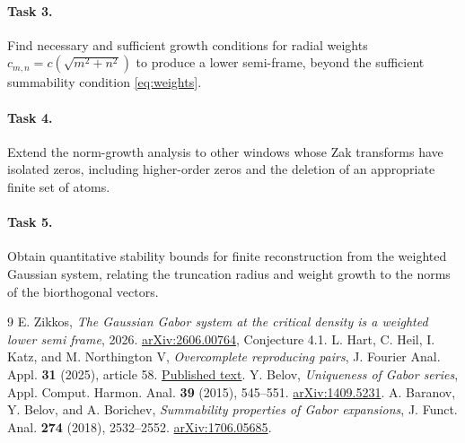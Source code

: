 \documentclass[11pt]{article}
\begin{document}
\paragraph{Task 3.}
Find necessary and sufficient growth conditions for radial weights
$c_{m,n}=c(\sqrt{m^2+n^2})$ to produce a lower semi-frame, beyond the
sufficient summability condition \eqref{eq:weights}.

\paragraph{Task 4.}
Extend the norm-growth analysis to other windows whose Zak transforms
have isolated zeros, including higher-order zeros and the deletion
of an appropriate finite set of atoms.

\paragraph{Task 5.}
Obtain quantitative stability bounds for finite reconstruction from the
weighted Gaussian system, relating the truncation radius and weight
growth to the norms of the biorthogonal vectors.

\begin{thebibliography}{9}
E. Zikkos, \emph{The Gaussian Gabor system at the critical density is a
weighted lower semi frame}, 2026.
\href{https://arxiv.org/abs/2606.00764}{arXiv:2606.00764}, Conjecture 4.1.
L. Hart, C. Heil, I. Katz, and M. Northington V,
\emph{Overcomplete reproducing pairs},
J. Fourier Anal. Appl. \textbf{31} (2025), article 58.
\href{https://heil.math.gatech.edu/papers/reproducingpairs_journal.pdf}{Published text}.
Y. Belov, \emph{Uniqueness of Gabor series},
Appl. Comput. Harmon. Anal. \textbf{39} (2015), 545--551.
\href{https://arxiv.org/abs/1409.5231}{arXiv:1409.5231}.
A. Baranov, Y. Belov, and A. Borichev,
\emph{Summability properties of Gabor expansions},
J. Funct. Anal. \textbf{274} (2018), 2532--2552.
\href{https://arxiv.org/abs/1706.05685}{arXiv:1706.05685}.
\end{thebibliography}
\end{document}
